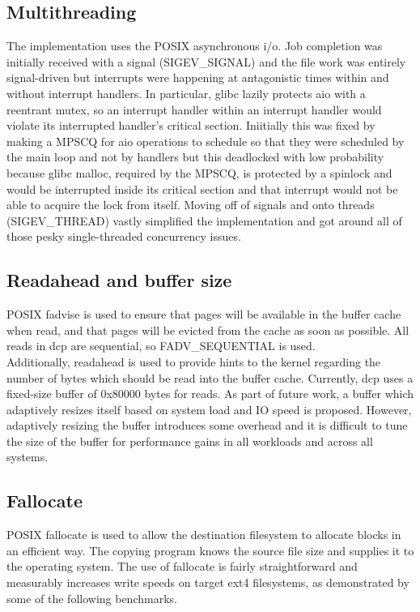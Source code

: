 \documentclass[12pt]{article}
\begin{document}
\subsection{Multithreading}
The implementation uses the POSIX asynchronous i/o. Job completion was initially
received with a signal (SIGEV\_SIGNAL) and the file work was entirely signal-driven
but interrupts were happening at antagonistic times within and without interrupt
handlers. In particular, glibc lazily protects aio with a reentrant mutex, so an
interrupt handler within an interrupt handler would violate its interrupted handler's
critical section. Iniitially this was fixed by making a MPSCQ for aio operations to schedule
so that they were scheduled by the main loop and not by handlers but this deadlocked with low
probability because glibc malloc, required by the MPSCQ, is protected by a spinlock and
would be interrupted inside its critical section and that interrupt would not be
able to acquire the lock from itself. Moving off of signals and onto threads (SIGEV\_THREAD)
vastly simplified the implementation and got around all of those pesky single-threaded
concurrency issues. \\

\subsection{Readahead and buffer size}
POSIX fadvise is used to ensure that pages will be available
in the buffer cache when read, and that pages will be evicted from
the cache as soon as possible. All reads in dcp are
sequential, so FADV\_SEQUENTIAL is used. \\

Additionally, readahead is used to provide hints to the kernel
regarding the number of bytes which should be read into the buffer cache.
Currently, dcp uses a fixed-size buffer of 0x80000 bytes for reads.
As part of future work, a buffer which adaptively resizes itself based on system
load and IO speed is proposed. However, adaptively resizing the buffer introduces
some overhead and it is difficult to tune the size of the buffer for performance gains
in all workloads and across all systems. \\%

\subsection{Fallocate}
POSIX fallocate is used to allow the destination filesystem to
allocate blocks in an efficient way. The copying program knows
the source file size and supplies it to the operating system.
The use of fallocate is fairly straightforward and measurably
increases write speeds on target ext4 filesystems, as demonstrated
by some of the following benchmarks. \\
\end{document}
